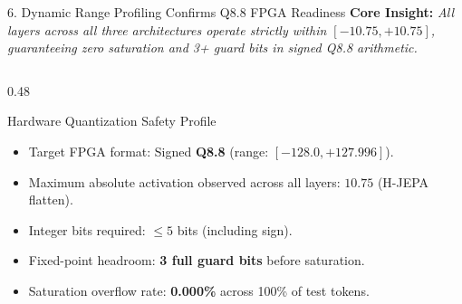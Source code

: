 \documentclass[aspectratio=169, 10pt]{beamer}
\begin{document}
\begin{frame}{6. Dynamic Range Profiling Confirms Q8.8 FPGA Readiness}
  \textbf{Core Insight:} \textit{All layers across all three architectures operate strictly within $[-10.75, +10.75]$, guaranteeing zero saturation and 3+ guard bits in signed Q8.8 arithmetic.}

  \vspace{0.2cm}
  \begin{columns}[T]
    \begin{column}{0.48\textwidth}
      \begin{block}{Hardware Quantization Safety Profile}
        \small
        \begin{itemize}
          \item Target FPGA format: Signed \textbf{Q8.8} (range: $[-128.0, +127.996]$).
          \item Maximum absolute activation observed across all layers: $\mathbf{10.75}$ (H-JEPA flatten).
          \item Integer bits required: $\le 5$ bits (including sign).
          \item Fixed-point headroom: \textbf{3 full guard bits} before saturation.
          \item Saturation overflow rate: \textbf{0.000\%} across 100\% of test tokens.
        \end{itemize}
      \end{block}
    \end{column}


\end{columns}
\end{frame}
\end{document}
